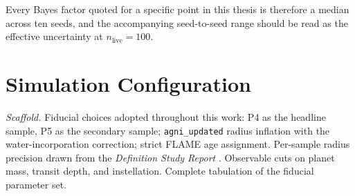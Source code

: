 Every Bayes factor quoted for a specific point in this thesis is
therefore a median across ten seeds, and the accompanying
seed-to-seed range should be read as the effective uncertainty at
$n_\mathrm{live}=100$.


\section{Simulation Configuration}
\label{sec:simulation_config}

\emph{Scaffold.}
Fiducial choices adopted throughout this work: \PLATO P4 as the
headline sample, P5 as the secondary sample;
\texttt{agni\_updated} radius inflation with the
\textcite{DornLichtenberg2021} water-incorporation correction;
strict FLAME age assignment.  Per-sample radius precision drawn from
the \emph{\PLATO Definition Study Report} \parencite{ESA2017PLATO}.
Observable cuts on planet mass, transit depth, and instellation.
Complete tabulation of the fiducial parameter set.
